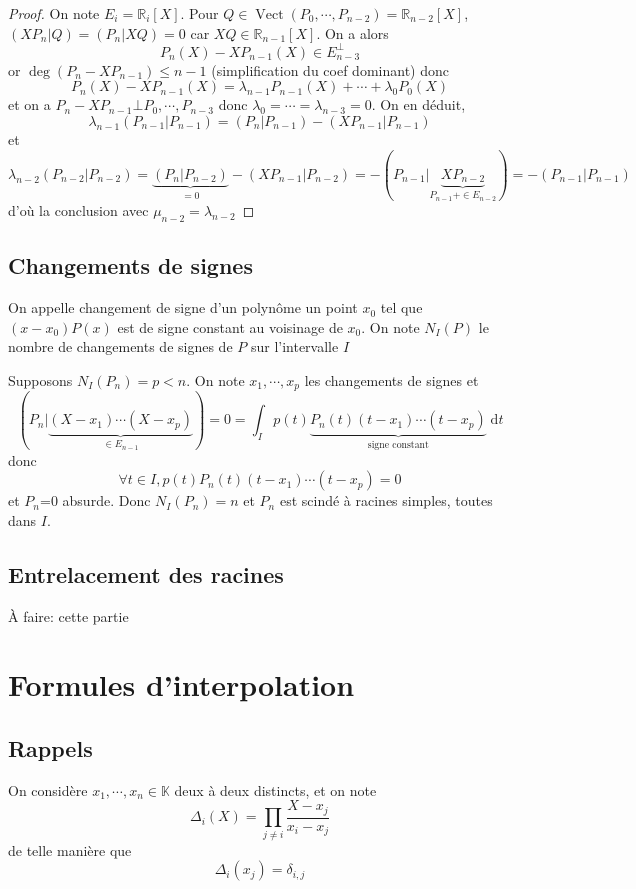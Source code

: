 \documentclass{article}
\theoremstyle{definition}
\DeclareMathOperator{\Vect}{Vect}
\newcommand{\todo}[1]{{\color{red}À faire: #1}}
\begin{document}
\begin{proof} On note $E_i=\mathbb R_i[X]$.
Pour $Q\in\Vect(P_0, \cdots, P_{n-2})=\mathbb R_{n-2}[X]$, $(XP_n|Q)=(P_n|XQ)=0$ car $XQ\in\mathbb R_{n-1}[X]$. On a alors \[
    P_n(X)-XP_{n-1}(X)\in E_{n-3}^\bot 
\]
or $\deg (P_n-XP_{n-1})\leq n-1$ (simplification du coef dominant) donc \[
    P_n(X)-XP_{n-1}(X)=\lambda_{n-1}P_{n-1}(X)+\cdots +\lambda_0P_0(X)
\]
et on a $P_n-XP_{n-1}\bot P_0, \cdots, P_{n-3}$ donc $\lambda_0=\cdots =\lambda_{n-3}=0$. On en déduit, \[
    \lambda_{n-1}(P_{n-1}|P_{n-1})=(P_n|P_{n-1})-(XP_{n-1}|P_{n-1})
\]
et \[
    \lambda_{n-2}(P_{n-2}|P_{n-2})=\underbrace{(P_n|P_{n-2})}_{=0}-(XP_{n-1}|P_{n-2})=-(P_{n-1}|\underbrace{XP_{n-2}}_{P_{n-1}+\in E_{n-2}})=-(P_{n-1}|P_{n-1})
\]
d'où la conclusion avec $\mu_{n-2}=\lambda_{n-2}$
\end{proof}

\subsection{Changements de signes}

On appelle changement de signe d'un polynôme un point $x_0$ tel que $(x-x_0)P(x)$ est de signe constant au voisinage de $x_0$. On note $N_I(P)$ le nombre de changements de signes de $P$ sur l'intervalle $I$

Supposons $N_I(P_n)=p<n$. On note $x_1, \cdots, x_p$ les changements de signes et \[
    (P_n | \underbrace{(X-x_1)\cdots (X-x_p)}_{\in E_{n-1}})=0=\int_Ip(t)\underbrace{P_n(t)(t-x_1)\cdots (t-x_p)}_{\text{signe constant}}\;\mathrm dt
\]
donc \[
    \forall t\in I, p(t)P_n(t)(t-x_1)\cdots (t-x_p)=0
\]
et $P_n$=0 absurde. Donc $N_I(P_n)=n$ et $P_n$ est scindé à racines simples, toutes dans $I$.

\subsection{Entrelacement des racines}

\todo{cette partie}

\section{Formules d'interpolation}

\subsection{Rappels}

On considère $x_1, \cdots, x_n\in\mathbb K$ deux à deux distincts, et on note \[
    \Delta_i(X)=\prod_{j\neq i}\frac{X-x_j}{x_i-x_j}
\]
de telle manière que \[
    \Delta_i(x_j)=\delta_{i, j}
\]
\end{document}
